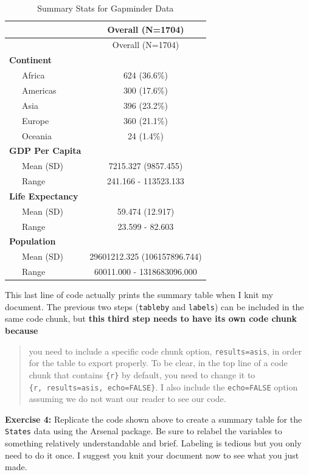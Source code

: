\documentclass[
]{book}
\newenvironment{rmdblock}[1]
  {\begin{shaded*}
  }
  {\end{shaded*}
  }
\newenvironment{learncheck}
  {\begin{rmdblock}{warning}}
  {\end{rmdblock}}
\begin{document}
\begin{longtable}[]{@{}lc@{}}
\caption{\label{tab:unnamed-chunk-116}Summary Stats for Gapminder Data}\tabularnewline
\toprule\noalign{}
& Overall (N=1704) \\
\midrule\noalign{}
\endfirsthead
\toprule\noalign{}
& Overall (N=1704) \\
\midrule\noalign{}
\endhead
\bottomrule\noalign{}
\endlastfoot
\textbf{Continent} & \\
~~~Africa & 624 (36.6\%) \\
~~~Americas & 300 (17.6\%) \\
~~~Asia & 396 (23.2\%) \\
~~~Europe & 360 (21.1\%) \\
~~~Oceania & 24 (1.4\%) \\
\textbf{GDP Per Capita} & \\
~~~Mean (SD) & 7215.327 (9857.455) \\
~~~Range & 241.166 - 113523.133 \\
\textbf{Life Expectancy} & \\
~~~Mean (SD) & 59.474 (12.917) \\
~~~Range & 23.599 - 82.603 \\
\textbf{Population} & \\
~~~Mean (SD) & 29601212.325 (106157896.744) \\
~~~Range & 60011.000 - 1318683096.000 \\
\end{longtable}

This last line of code actually prints the summary table when I knit my document. The previous two steps (\texttt{tableby} and \texttt{labels}) can be included in the same code chunk, but \textbf{this third step needs to have its own code chunk because}

\begin{quote}
you need to include a specific code chunk option, \texttt{results=\textquotesingle{}asis\textquotesingle{}}, in order for the table to export properly. To be clear, in the top line of a code chunk that contains \texttt{\{r\}} by default, you need to change it to \texttt{\{r,\ results=\textquotesingle{}asis\textquotesingle{},\ echo=FALSE\}}. I also include the \texttt{echo=FALSE} option assuming we do not want our reader to see our code.
\end{quote}

\begin{learncheck}
\textbf{Exercise 4:} Replicate the code shown above to create a summary
table for the \texttt{States} data using the Arsenal package. Be sure to
relabel the variables to something relatively understandable and brief.
Labeling is tedious but you only need to do it once. I suggest you knit
your document now to see what you just made.
\end{learncheck}
\end{document}
